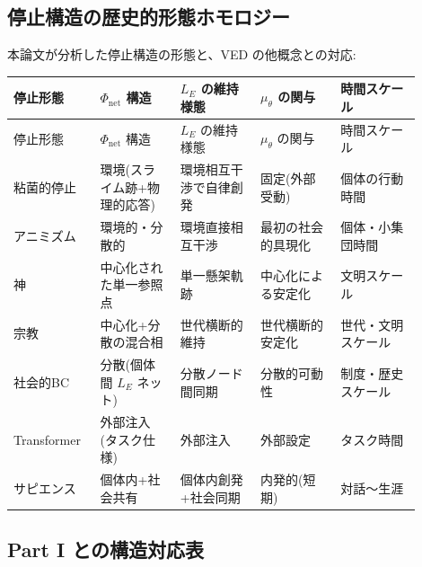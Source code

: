 \bigskip


\subsection{停止構造の歴史的形態ホモロジー}


本論文が分析した停止構造の形態と、VED の他概念との対応:

\begin{longtable}{@{}p{0.18\linewidth}p{0.18\linewidth}p{0.18\linewidth}p{0.18\linewidth}p{0.18\linewidth}@{}}
\toprule
停止形態 & $\Phi_{\text{net}}$ 構造 & $L_E$ の維持様態 & $\mu_\theta$ の関与 & 時間スケール \\
\midrule
\endfirsthead
\toprule
停止形態 & $\Phi_{\text{net}}$ 構造 & $L_E$ の維持様態 & $\mu_\theta$ の関与 & 時間スケール \\
\midrule
\endhead
粘菌的停止 & 環境(スライム跡+物理的応答) & 環境相互干渉で自律創発 & 固定(外部受動) & 個体の行動時間 \\
アニミズム & 環境的・分散的 & 環境直接相互干渉 & 最初の社会的具現化 & 個体・小集団時間 \\
神 & 中心化された単一参照点 & 単一懸架軌跡 & 中心化による安定化 & 文明スケール \\
宗教 & 中心化+分散の混合相 & 世代横断的維持 & 世代横断的安定化 & 世代・文明スケール \\
社会的BC & 分散(個体間 $L_E$ ネット) & 分散ノード間同期 & 分散的可動性 & 制度・歴史スケール \\
Transformer & 外部注入(タスク仕様) & 外部注入 & 外部設定 & タスク時間 \\
サピエンス & 個体内+社会共有 & 個体内創発+社会同期 & 内発的(短期) & 対話〜生涯 \\
\bottomrule
\end{longtable}


\bigskip


\subsection{Part I との構造対応表}


